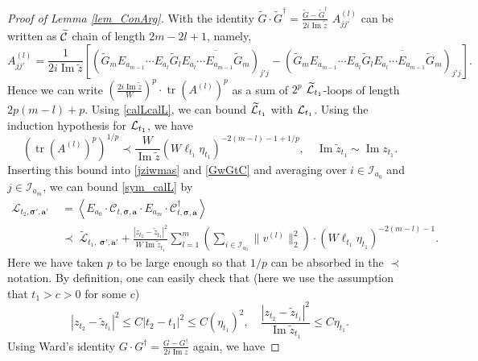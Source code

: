\documentclass[10pt,reqno]{article}
\DeclareMathOperator{\im}{{\mathrm{Im}}}
\theoremstyle{plain} %
\theoremstyle{remark}
\numberwithin{equation}{section}
\begin{document}
\begin{proof}[Proof of Lemma \ref{lem_ConArg}]
With  the identity $\widetilde{G} \cdot \widetilde{G}^\dagger = \frac{\widetilde{G} - \widetilde{G}^\dagger}{2 i\operatorname{Im} \widetilde{z}}$ 
$  A^{(l)}_{jj'}$ can be written as $\widetilde{\cal C}$ chain of length $2m-2l+1$, namely,   
$$
     A^{(l)}_{jj'}
     =  \frac{1}{2i \operatorname{Im}\widetilde{z}}
   \left[ \left(
    \widetilde{G}_m  E_{a_{m-1}}  \cdots E_{a_l}\widetilde{G}_l \overline{ E_{a_l} \cdots E_{a_{m-1}} \widetilde{G}_m}
  \right)_{j' j}   
  -
    \left(
    \widetilde{G}_m  E_{a_{m-1}}  \cdots E_{a_l}\overline{\widetilde{G}_l E_{a_l} \cdots E_{a_{m-1}} \widetilde{G}_m} \right)_{j' j} 
    \right].
$$
Hence we can write $\left( \frac{2 i\operatorname{Im} \widetilde{z}}{W} \right)^p \cdot \operatorname{tr} \left( A^{(l)} \right)^p$
as a sum of $2^p$ $\widetilde{\cal L}_{t_1}$-loops of length $2p(m-l)+p$. Using \eqref{calLcalL}, we can bound
 $\widetilde{\cal L}_{t_1}$ with $ {\cal L}_{t_1}$.  Using the induction hypothesis for $ {\cal L}_{t_1}$, we have 
    $$
    \left( \operatorname{tr} \left( A^{(l)} \right)^p \right)^{1/p} 
    \prec \frac{W}{\operatorname{Im} \widetilde{z}} 
    \left( W \ell_{t_1} \eta_{t_1} \right)^{-2(m-l)-1+1/p}, \quad \im \widetilde{z}_{t_1}\sim \im z_{t_1}. 
    $$
Inserting  this bound  into \eqref{jziwmas} and \eqref{GwGtC} and averaging  over $i \in \mathcal{I}_{a_0}$ and $j \in \mathcal{I}_{a_m}$,  we can bound \eqref{sym_calL} by 
\begin{align}\label{LLVWL}
        \mathcal{L}_{t_2, \boldsymbol{\sigma}', \textbf{a}'} 
        & \; = \left\langle E_{a_0} \cdot \mathcal{C}_{t, \boldsymbol{\sigma}, \textbf{a}} \cdot E_{a_m} \cdot \mathcal{C}^\dagger_{t, \boldsymbol{\sigma}, \textbf{a}} \right\rangle 
     \nonumber    \\
         & \;  \prec \; \widetilde{\mathcal{L}}_{t_1 , \;  \boldsymbol{\sigma}' , \textbf{a}'} 
         +\frac{|z_{t_2}-\widetilde{z}_{t_1}|^2}{W\operatorname{Im} \widetilde{z}_{t_1}}
         \sum_{l=1}^m 
         \left(\sum_{i \in \mathcal{I}_{a_0}}  \|v^{(l)}\|_2^2\right)\cdot 
         \left( W \ell_{t_1} \eta_{t_1} \right)^{-2(m-l)-1}.
\end{align} 
Here we have taken $p$ to be large enough so that  $1/p$ can be absorbed  in  the $\prec$ notation.  
By definition, one can easily check that (here  we use the assumption that   $t_1>c>0$ for some $c$)
$$
    |z_{t_2}-\widetilde{z}_{t_1}|^2\le C |t_2-t_1|^2\le C\left(\eta _{t_1}\right)^2,\quad \frac{|z_{t_2}-\widetilde{z}_{t_1}|^2}{\operatorname{Im} \widetilde{z}_{t_1}}
    \le C \eta _{t_1} .
$$
Using Ward's  identity $G \cdot G^\dagger = \frac{G - G^\dagger}{2 i\operatorname{Im} z}$ again, we have 

\end{proof}
\end{document}
